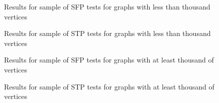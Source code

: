 \begin{figure}[hb]
  \centering
  
  \caption{Results for sample of SFP tests for graphs with less than thousand vertices}
\end{figure}

\begin{figure}[hb]
  \centering
  
  \caption{Results for sample of STP tests for graphs with less than thousand vertices}
\end{figure}

\begin{figure}[hb]
  \centering
  
  \caption{Results for sample of SFP tests for graphs with at least thousand of vertices}
\end{figure}

\begin{figure}[hb]
  \centering
  
  \caption{Results for sample of STP tests for graphs with at least thousand of vertices}
\end{figure}
\FloatBarrier
